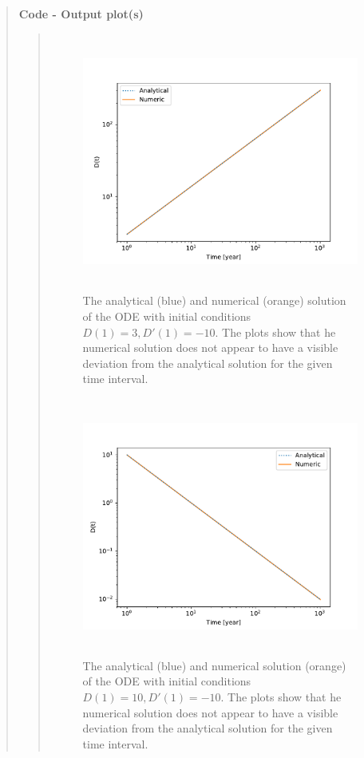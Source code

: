 \begin{quote}
\textbf{Code - Output plot(s)}
\begin{quote}
\begin{figure}[!ht]
\centering
\includegraphics[width=14cm, height=8.5cm]{./Plots/3_ode_0.pdf}
\caption{The analytical (blue) and numerical (orange) solution of the ODE with initial conditions $D(1) = 3, D'(1) = -10$. The plots show that he numerical solution does not appear to have a visible deviation from the analytical solution for the given time interval.}
\end{figure}

\begin{figure}[!ht]
\centering
\includegraphics[width=14cm, height=8.5cm]{./Plots/3_ode_1.pdf}
\caption{The analytical (blue) and numerical solution (orange) of the ODE with initial conditions $D(1) = 10,  D'(1) = -10$. The plots show that he numerical solution does not appear to have a visible deviation from the analytical solution for the given time interval.}
\end{figure}
\newpage



\end{quote}
\end{quote}
